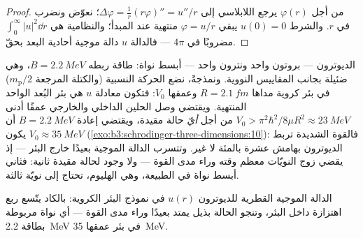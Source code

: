 \begin{proof}
من أجل $\varphi(r)$ يرجع اللابلاسي إلى $\Delta\varphi =
\tfrac1r(r\varphi)'' = u''/r$؛ نعوّض ونضرب في $r$. والشرط
$u(0) = 0$ يبقي $\varphi = u/r$ منتهية عند المبدأ؛
والنظامية هي $\int_0^\infty|u|^2\dd r$ مضروبًا في $4\pi$ --- فالدالة $u$
دالة موجية أحادية البعد بحقّ.
\end{proof}

\begin{example}\label{ex:b3:schrodinger-three-dimensions:deuteron}
الديوترون --- بروتون واحد ونترون واحد --- أبسط نواة:
طاقة ربطه $B = \qty{2.2}{MeV}$، وهي ضئيلة بجانب المقاييس النووية.
ونمذجةً، نضع الحركة النسبية (والكتلة المرجعة $m_{\text{p}}/2$) في
بئر كروية مداها $R = \qty{2.1}{fm}$ وعمقها $V_0$: فتكون
معادلة $u$ هي بئر البُعد الواحد المنتهية. ويقتضي وصل الحلين
الداخلي والخارجي عمقًا أدنى $V_0 > \pi^2\hbar^2/8\mu R^2
\approx \qty{23}{MeV}$ من أجل \emph{أيّ} حالة مقيدة، ويقتضي إعادة
$B = \qty{2.2}{MeV}$ أن يكون $V_0 \approx \qty{35}{MeV}$
(\cref{exo:b3:schrodinger-three-dimensions:10}): فالقوة الشديدة
تربط الديوترون بهامش عشرة بالمئة لا غير. وتتسرب الدالة الموجية
بعيدًا خارج البئر --- إذ يقضي زوج النويّات معظم وقته
وراء مدى القوة --- ولا وجود لحالة مقيدة ثانية: فثاني أبسط نواة
في الطبيعة، وهي الهليوم، تحتاج إلى نويّة ثالثة.
\end{example}

\begin{omfigure}

{\small الدالة الموجية القطرية للديوترون $u(r)$ في نموذج
البئر الكروية: بالكاد يتّسع ربع اهتزازة داخل
البئر، وتنجو الحالة بذيل يمتد بعيدًا وراء مدى
القوة --- أي نواة مربوطة بطاقة \qty{2.2}{MeV} في بئر
عمقها \qty{35}{MeV}.}
\end{omfigure}

